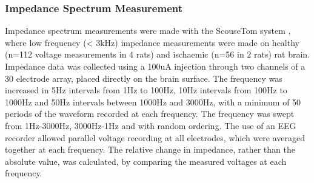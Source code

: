 \subsubsection{Impedance Spectrum Measurement}

Impedance spectrum measurements were made with the ScouseTom system \cite{Dowrick_2015}, where low frequency (< 3kHz) impedance measurements were made on healthy (n=112 voltage measurements in 4 rats) and ischaemic (n=56 in 2 rats) rat brain. Impedance data was collected using a 100uA injection through two channels of a 30 electrode array, placed directly on the brain surface. The frequency was increased in 5Hz intervals from 1Hz to 100Hz, 10Hz intervals from 100Hz to 1000Hz and 50Hz intervals between 1000Hz and 3000Hz, with a minimum of 50 periods of the waveform recorded at each frequency. The frequency was swept from 1Hz-3000Hz, 3000Hz-1Hz and with random ordering. The use of an EEG recorder allowed parallel voltage recording at all electrodes, which were averaged together at each frequency. The relative change in impedance, rather than the absolute value, was calculated, by comparing the measured voltages at each frequency.